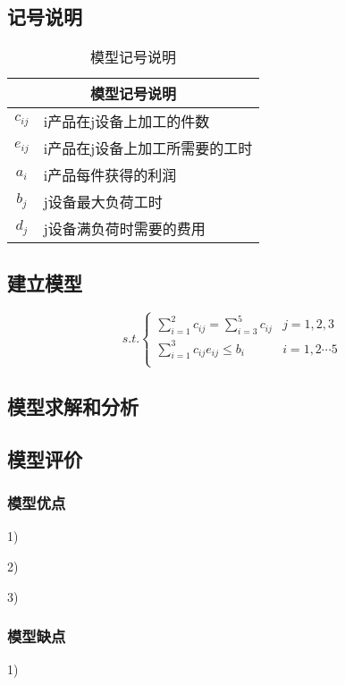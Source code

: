 \documentclass{cumcmart}
\begin{document}
\subsection{记号说明}
\begin{table}[!htbp]
    \centering
    \begin{tabular}{cl}
    \toprule
    \multicolumn{2}{c}{\large 模型记号说明}\\
    \midrule
    ${c_{ij}}$ &  i产品在j设备上加工的件数 \\
    ${e_{ij}}$ &  i产品在j设备上加工所需要的工时 \\
    ${a_i}$    &  i产品每件获得的利润 \\
    ${b_j}$    &  j设备最大负荷工时 \\
    ${d_j}$    &  j设备满负荷时需要的费用 \\
    \bottomrule
    \end{tabular}
    \caption{模型记号说明}
\end{table}

\subsection{建立模型}

    
    \[ %
    s.t.
    \left\{  
    \begin{array}{ll}  
    \sum\limits_{i=1}^{2}{c_{ij}} = \sum\limits_{i=3}^{5}{c_{ij}} & j  = 1,2,3  \\ 
     \sum\limits_{i=1}^{3}{c_{ij}e_{ij}} \leqslant b_{i} & i = 1,2 \cdots 5 \\
    \end{array}  
    \right.
    \] %

\subsection{模型求解和分析}
 

\subsection{模型评价}
\subsubsection{模型优点}
1)	

2)	

3)	

\subsubsection{模型缺点}
1)	
\end{document}
